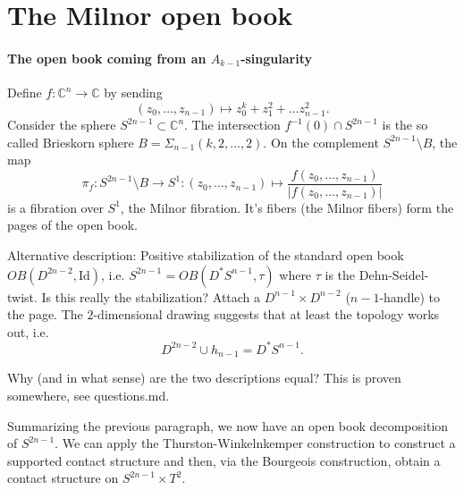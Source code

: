 \section*{The Milnor open book}

\paragraph*{The open book coming from an $A_{k-1}$-singularity}
Define $f\colon \mathbb C^n \to \mathbb C$ by sending
\[
    (z_0, \dots, z_{n-1}) \mapsto z_0^k + z_1^2 + \dots z_{n-1}^2.  
\]
Consider the sphere $S^{2n-1} \subset \mathbb C^n$.
The intersection $f^{-1}(0) \cap S^{2n-1}$ is the so called Brieskorn sphere $B = \Sigma_{n-1}(k,2,\dots,2)$.
On the complement $S^{2n-1} \setminus B$, the map
\[
    \pi_f\colon S^{2n-1}\setminus B \to S^1\colon (z_0, \dots, z_{n-1}) \mapsto \frac{f(z_0, \dots, z_{n-1})}{|f(z_0, \dots, z_{n-1})|}
\]
is a fibration over $S^1$, the Milnor fibration.
It's fibers (the Milnor fibers) form the pages of the open book.

Alternative description: Positive stabilization of the standard open book $OB(D^{2n-2}, \mathrm{Id})$,
i.e. $S^{2n-1} = OB(D^*S^{n-1}, \tau)$ where $\tau$ is the Dehn-Seidel-twist.
Is this really the stabilization?
Attach a $D^{n-1} \times D^{n-2}$ ($n-1$-handle) to the page.
The $2$-dimensional drawing suggests that at least the topology works out, i.e.
\[
    D^{2n-2} \cup h_{n-1} = D^*S^{n-1}.
\]

Why (and in what sense) are the two descriptions equal? This is proven somewhere, see questions.md.

Summarizing the previous paragraph, we now have an open book decomposition of $S^{2n-1}$.
We can apply the Thurston-Winkelnkemper construction to construct a supported contact structure
and then, via the Bourgeois construction, obtain a contact structure on $S^{2n-1} \times T^2$.